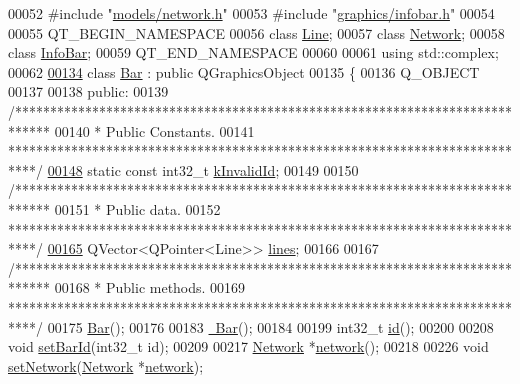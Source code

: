 \begin{DoxyCode}
00052 \textcolor{preprocessor}{#include "\hyperlink{network_8h}{models/network.h}"}
00053 \textcolor{preprocessor}{#include "\hyperlink{infobar_8h}{graphics/infobar.h}"}
00054 
00055 QT\_BEGIN\_NAMESPACE
00056 \textcolor{keyword}{class }\hyperlink{class_line}{Line};
00057 \textcolor{keyword}{class }\hyperlink{class_network}{Network};
00058 \textcolor{keyword}{class }\hyperlink{class_info_bar}{InfoBar};
00059 QT\_END\_NAMESPACE
00060 
00061 \textcolor{keyword}{using} std::complex;
00062 
\hypertarget{bar_8h_source_l00134}{}\hyperlink{class_bar}{00134} \textcolor{keyword}{class }\hyperlink{class_bar}{Bar} : \textcolor{keyword}{public} QGraphicsObject
00135 \{
00136   Q\_OBJECT
00137 
00138 \textcolor{keyword}{public}:
00139   \textcolor{comment}{/*****************************************************************************}
00140 \textcolor{comment}{   * Public Constants.}
00141 \textcolor{comment}{   ****************************************************************************/}
\hypertarget{bar_8h_source_l00148}{}\hyperlink{group___models_ga9919592c0397ed41448dfb20b607d738}{00148}   \textcolor{keyword}{static} \textcolor{keyword}{const} int32\_t \hyperlink{group___models_ga9919592c0397ed41448dfb20b607d738}{kInvalidId};
00149 
00150   \textcolor{comment}{/*****************************************************************************}
00151 \textcolor{comment}{   * Public data.}
00152 \textcolor{comment}{   ****************************************************************************/}
\hypertarget{bar_8h_source_l00165}{}\hyperlink{class_bar_a5aabf1f4ac22e20e9cb702a3a7e08eea}{00165}   QVector<QPointer<Line>> \hyperlink{class_bar_a5aabf1f4ac22e20e9cb702a3a7e08eea}{lines};
00166 
00167   \textcolor{comment}{/*****************************************************************************}
00168 \textcolor{comment}{   * Public methods.}
00169 \textcolor{comment}{   ****************************************************************************/}
00175   \hyperlink{group___models_ga9cae2188fcc6cce41caa7898c64548d1}{Bar}();
00176 
00183   \hyperlink{group___models_ga9c7ebea0c189423591741ac438985316}{~Bar}();
00184 
00199   int32\_t \hyperlink{group___models_gacf0fb781a73856bb7beb823304465e13}{id}();
00200 
00208   \textcolor{keywordtype}{void} \hyperlink{group___models_gae3cf341a76cc4589fe3203d0a3ed2ac0}{setBarId}(int32\_t \textcolor{keywordtype}{id});
00209 
00217   \hyperlink{class_network}{Network} *\hyperlink{group___models_gab0594d5d7313e8749bb85434b255db9a}{network}();
00218 
00226   \textcolor{keywordtype}{void} \hyperlink{group___models_gade9a307fdb6a81871787899ec1af5833}{setNetwork}(\hyperlink{class_network}{Network} *\hyperlink{group___models_gab0594d5d7313e8749bb85434b255db9a}{network});

\end{DoxyCode}
